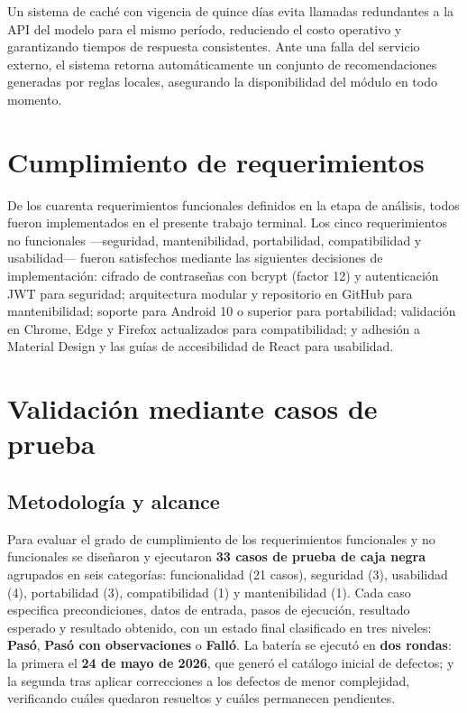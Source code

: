 Un sistema de caché con vigencia de quince días evita llamadas
redundantes a la API del modelo para el mismo período, reduciendo el
costo operativo y garantizando tiempos de respuesta consistentes. Ante
una falla del servicio externo, el sistema retorna automáticamente un
conjunto de recomendaciones generadas por reglas locales, asegurando
la disponibilidad del módulo en todo momento.

\section{Cumplimiento de requerimientos}

De los cuarenta requerimientos funcionales definidos en la etapa de
análisis, todos fueron implementados en el presente trabajo terminal.
Los cinco requerimientos no funcionales —seguridad, mantenibilidad,
portabilidad, compatibilidad y usabilidad— fueron satisfechos mediante
las siguientes decisiones de implementación: cifrado de contraseñas con
bcrypt (factor 12) y autenticación JWT para seguridad; arquitectura
modular y repositorio en GitHub para mantenibilidad; soporte para
Android 10 o superior para portabilidad; validación en Chrome, Edge y
Firefox actualizados para compatibilidad; y adhesión a Material Design
y las guías de accesibilidad de React para usabilidad.

\section{Validación mediante casos de prueba}

\subsection{Metodología y alcance}

Para evaluar el grado de cumplimiento de los requerimientos funcionales y no funcionales se diseñaron y ejecutaron \textbf{33 casos de prueba de caja negra} agrupados en seis categorías: funcionalidad (21 casos), seguridad (3), usabilidad (4), portabilidad (3), compatibilidad (1) y mantenibilidad (1). Cada caso especifica precondiciones, datos de entrada, pasos de ejecución, resultado esperado y resultado obtenido, con un estado final clasificado en tres niveles: \textbf{Pasó}, \textbf{Pasó con observaciones} o \textbf{Falló}. La batería se ejecutó en \textbf{dos rondas}: la primera el \textbf{24 de mayo de 2026}, que generó el catálogo inicial de defectos; y la segunda tras aplicar correcciones a los defectos de menor complejidad, verificando cuáles quedaron resueltos y cuáles permanecen pendientes.

